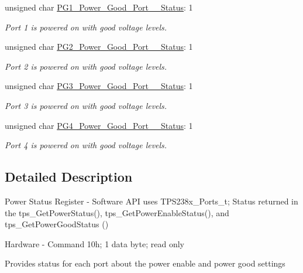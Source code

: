 \begin{DoxyCompactItemize}
unsigned char \hyperlink{struct_t_p_s238x___power___stauts___register__t_aa576d69a47b1aecb02df4efee5f39497}{P\-G1\-\_\-\-Power\-\_\-\-Good\-\_\-\-Port\-\_\-\_\-\-Status}\-: 1
\begin{DoxyCompactList}\small\item\em Port 1 is powered on with good voltage levels. \end{DoxyCompactList}\item 
unsigned char \hyperlink{struct_t_p_s238x___power___stauts___register__t_a168286e95b81ee2bbb4e1be7b6d5a150}{P\-G2\-\_\-\-Power\-\_\-\-Good\-\_\-\-Port\-\_\-\_\-\-Status}\-: 1
\begin{DoxyCompactList}\small\item\em Port 2 is powered on with good voltage levels. \end{DoxyCompactList}\item 
unsigned char \hyperlink{struct_t_p_s238x___power___stauts___register__t_a8bd40ecb8603bf9c320cd61a0b1cb0ad}{P\-G3\-\_\-\-Power\-\_\-\-Good\-\_\-\-Port\-\_\-\_\-\-Status}\-: 1
\begin{DoxyCompactList}\small\item\em Port 3 is powered on with good voltage levels. \end{DoxyCompactList}\item 
unsigned char \hyperlink{struct_t_p_s238x___power___stauts___register__t_a66ca44d4b7146b2a5e01f79042f18162}{P\-G4\-\_\-\-Power\-\_\-\-Good\-\_\-\-Port\-\_\-\_\-\-Status}\-: 1
\begin{DoxyCompactList}\small\item\em Port 4 is powered on with good voltage levels. \end{DoxyCompactList}\end{DoxyCompactItemize}


\subsection{Detailed Description}
Power Status Register -\/ Software A\-P\-I uses T\-P\-S238x\-\_\-\-Ports\-\_\-t; Status returned in the tps\-\_\-\-Get\-Power\-Status(), tps\-\_\-\-Get\-Power\-Enable\-Status(), and tps\-\_\-\-Get\-Power\-Good\-Status () \par
 Hardware -\/ Command 10h; 1 data byte; read only \par
\par
 Provides status for each port about the power enable and power good settings 

